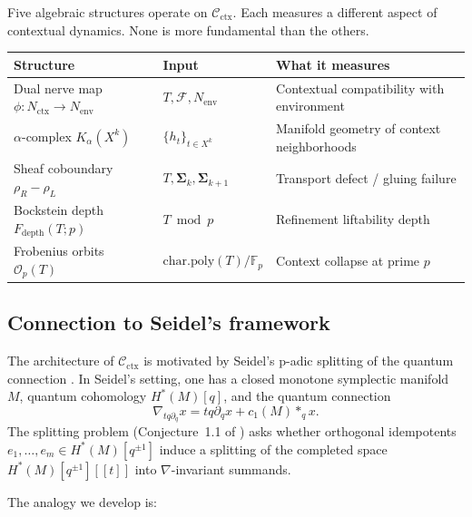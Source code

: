 \documentclass[11pt]{amsart}
\theoremstyle{definition}
\newcommand{\Cctx}{\mathcal{C}_{\!\mathrm{ctx}}}
\newcommand{\Nctx}{N_{\mathrm{ctx}}}
\newcommand{\Nenv}{N_{\mathrm{env}}}
\newcommand{\Ka}{K_\alpha}
\newcommand{\Fp}{\mathbb{F}_p}
\newcommand{\rhoR}{\rho_R}
\newcommand{\rhoL}{\rho_L}
\begin{document}
Five algebraic structures operate on $\Cctx$.
Each measures a different aspect of contextual dynamics.
None is more fundamental than the others.

\begin{center}
\renewcommand{\arraystretch}{1.25}
\begin{tabular}{@{}lll@{}}
\toprule
Structure & Input & What it measures \\
\midrule
Dual nerve map $\phi: \Nctx \to \Nenv$ & $T, \mathcal{F}, \Nenv$
  & Contextual compatibility with environment \\
$\alpha$-complex $\Ka(X^k)$ & $\{h_t\}_{t \in X^k}$
  & Manifold geometry of context neighborhoods \\
Sheaf coboundary $\rhoR - \rhoL$ & $T, \boldsymbol{\Sigma}_k, \boldsymbol{\Sigma}_{k+1}$
  & Transport defect / gluing failure \\
Bockstein depth $F_{\mathrm{depth}}(T; p)$ & $T \bmod p$
  & Refinement liftability depth \\
Frobenius orbits $\mathcal{O}_p(T)$ & $\mathrm{char.poly}(T) / \Fp$
  & Context collapse at prime $p$ \\
\bottomrule
\end{tabular}
\end{center}

\subsection{Connection to Seidel's framework}

The architecture of $\Cctx$ is motivated by Seidel's p-adic splitting
of the quantum connection \cite{Seidel25}.
In Seidel's setting, one has a closed monotone symplectic manifold $M$,
quantum cohomology $H^*(M)[q]$, and the quantum connection
\[
  \nabla_{tq\partial_q} x = tq\partial_q x + c_1(M) *_q x.
\]
The splitting problem (Conjecture~1.1 of \cite{Seidel25}) asks whether
orthogonal idempotents $e_1, \ldots, e_m \in H^*(M)[q^{\pm 1}]$
induce a splitting of the completed space $H^*(M)[q^{\pm 1}][[t]]$
into $\nabla$-invariant summands.

The analogy we develop is:
\end{document}
